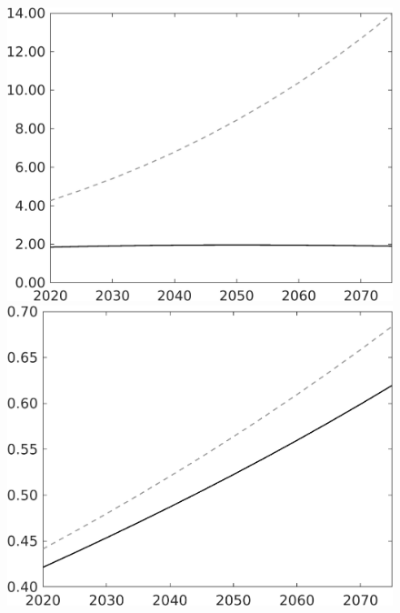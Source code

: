 \documentclass[12pt]{article}
\begin{document}
\begin{figure}[h!!]
\begin{minipage}[]{0.32\textwidth}
	\end{minipage}	
	\begin{minipage}[]{0.32\textwidth}
		\includegraphics[width=1\textwidth]{../../codding_model/own_basedOnFried/optimalPol_010922_revision/figures/all_13Sept22/LevTaufNoTauf_TaulCalib_regime0_pgpftf_spillover0_nsk0_xgr0_knspil1_sep1_LFlimit0_emsbase0_countec0_GovRev0_etaa0.79_lgd0.png}
	\end{minipage}
	\begin{minipage}[]{0.32\textwidth}
		\includegraphics[width=1\textwidth]{../../codding_model/own_basedOnFried/optimalPol_010922_revision/figures/all_13Sept22/LevTaufNoTauf_TaulCalib_regime0_E_spillover0_nsk0_xgr0_knspil1_sep1_LFlimit0_emsbase0_countec0_GovRev0_etaa0.79_lgd0.png}

\end{minipage}
\end{figure}
\end{document}
